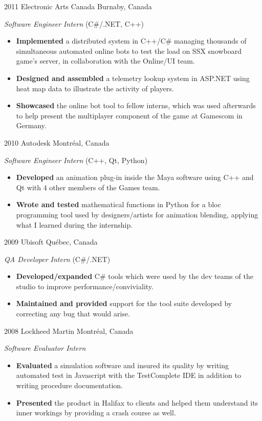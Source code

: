 \documentclass[]{friggeri-cv}
\begin{document}
\begin{entrylist}

\entry
{2011}
{Electronic Arts Canada}
{Burnaby, Canada}
{\emph{Software Engineer Intern} (C\#/.NET, C++)
	\begin{itemize}
		\item \textbf{Implemented} a distributed system in C++/C\# managing thousands of simultaneous automated online bots to test the load on SSX snowboard game's server, in collaboration with the Online/UI team.
		\item \textbf{Designed and assembled} a telemetry lookup system in ASP.NET using heat map data to illustrate the activity of players.
		\item \textbf{Showcased} the online bot tool to fellow interns, which was used afterwards to help present the multiplayer component of the game at Gamescom in Germany.
	\end{itemize}}


\entry
{2010}
{Autodesk}
{Montréal, Canada}
{\emph{Software Engineer Intern} (C++, Qt, Python)
\begin{itemize}
	\item \textbf{Developed} an animation plug-in inside the Maya software using C++ and Qt with 4 other members of the Games team.
	\item \textbf{Wrote and tested} mathematical functions in Python for a bloc programming tool used by designers/artists for animation blending, applying what I learned during the internship.
\end{itemize}}


\entry
{2009}
{Ubisoft}
{Québec, Canada}
{\emph{QA Developer Intern} (C\#/.NET)
\begin{itemize}
	\item \textbf{Developed/expanded} C\# tools which were used by the dev teams of the studio to improve performance/conviviality.
	\item \textbf{Maintained and provided} support for the tool suite developed by correcting any bug that would arise.
\end{itemize}}


\entry
{2008}
{Lockheed Martin}
{Montréal, Canada}
{\emph{Software Evaluator Intern}
	\begin{itemize}
		\item \textbf{Evaluated} a simulation software and insured its quality by writing automated test in Javascript with the TestComplete IDE in addition to writing procedure documentation.
		\item \textbf{Presented} the product in Halifax to clients and helped them understand its inner workings by providing a crash course as well.
	\end{itemize}}


\end{entrylist}
\end{document}
